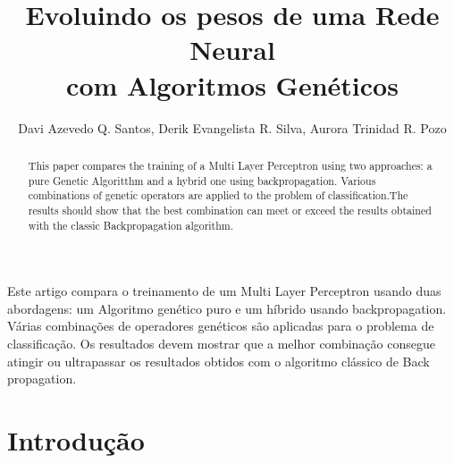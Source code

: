 \documentclass[12pt]{article}
\title{Evoluindo os pesos de uma Rede Neural \\com Algoritmos Genéticos}
\author{Davi Azevedo Q. Santos\inst{1}, Derik Evangelista R. Silva\inst{1}, Aurora Trinidad R. Pozo\inst{1}}
\begin{document}
 

\maketitle

\begin{abstract}
This paper compares the training of a Multi Layer Perceptron using two approaches: a pure Genetic Algoritthm and a hybrid one using backpropagation. Various combinations of genetic operators are applied to the problem of classification.The results should show that the best combination can meet or exceed the results obtained with the classic Backpropagation algorithm.
\end{abstract}
     
\begin{resumo} 
Este artigo compara o treinamento de um Multi Layer Perceptron usando duas abordagens: um Algoritmo 
genético puro e um híbrido usando backpropagation. Várias combinações de operadores genéticos são 
aplicadas para o problema de classificação. Os resultados devem mostrar que a melhor combinação consegue atingir ou ultrapassar os resultados obtidos com o algoritmo clássico de Back propagation.
\end{resumo}

\section{Introdução}
\end{document}
